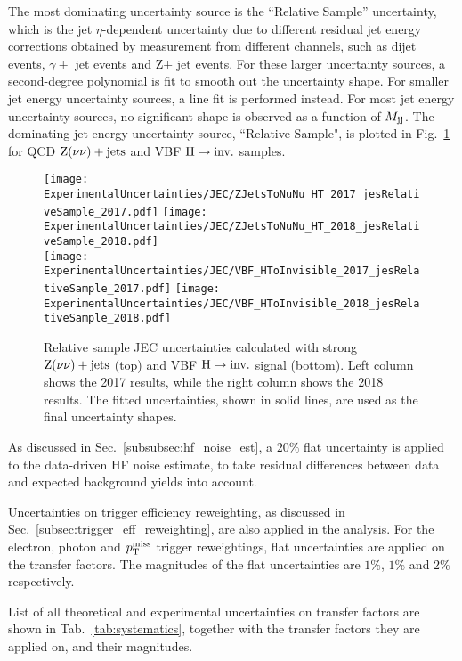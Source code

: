 The most dominating uncertainty source is the ``Relative Sample'' uncertainty, which is the jet $\eta$-dependent uncertainty due to different
residual jet energy corrections obtained by measurement from different channels, such as dijet events, $\gamma+$ jet events and Z$+$ jet events.
For these larger uncertainty sources, a second-degree polynomial is fit to smooth out the uncertainty shape. For smaller jet energy uncertainty sources,
a line fit is performed instead. For most jet energy uncertainty sources, no significant shape is observed as a function of $M_{\textrm{jj}}$.
The dominating jet energy uncertainty source, ``Relative Sample", 
is plotted in Fig.~\ref{fig:znunu_jec_uncs} for QCD $\textrm{Z}(\nu\nu)+\textrm{jets}$ and VBF $\textrm{H} \rightarrow \textrm{inv.}$ samples.

\begin{figure}[h!]
  \centering
  \texttt{[image: ExperimentalUncertainties/JEC/ZJetsToNuNu\_HT\_2017\_jesRelativeSample\_2017.pdf]}
  \texttt{[image: ExperimentalUncertainties/JEC/ZJetsToNuNu\_HT\_2018\_jesRelativeSample\_2018.pdf]} \\
  \texttt{[image: ExperimentalUncertainties/JEC/VBF\_HToInvisible\_2017\_jesRelativeSample\_2017.pdf]}
  \texttt{[image: ExperimentalUncertainties/JEC/VBF\_HToInvisible\_2018\_jesRelativeSample\_2018.pdf]}
  \caption{Relative sample JEC uncertainties calculated with strong $\textrm{Z}(\nu\nu)+\textrm{jets}$ (top) and VBF $\textrm{H} \rightarrow \textrm{inv.}$ signal (bottom). Left column shows the 2017 results, 
  while the right column shows the 2018 results. The fitted uncertainties, shown in solid lines, are used as the final uncertainty shapes.}
  \label{fig:znunu_jec_uncs}
\end{figure}

As discussed in Sec.~\ref{subsubsec:hf_noise_est}, a $20\%$ flat uncertainty is applied to the data-driven HF noise estimate, to take residual differences between
data and expected background yields into account.

Uncertainties on trigger efficiency reweighting, as discussed in Sec.~\ref{subsec:trigger_eff_reweighting}, are also applied in the analysis. For the electron, photon and
$p_{\textrm{T}}^{\textrm{miss}}$ trigger reweightings, flat uncertainties are applied on the transfer factors. The magnitudes of the flat uncertainties are $1\%$, $1\%$ and $2\%$ respectively. 

List of all theoretical and experimental uncertainties on transfer factors are shown in Tab.~\ref{tab:systematics}, together with the transfer factors they are applied on,
and their magnitudes.

